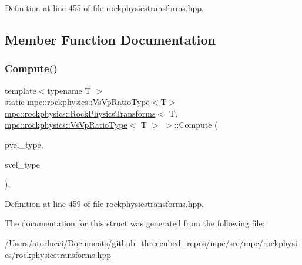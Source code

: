 Definition at line 455 of file rockphysicstransforms.\+hpp.



\subsection{Member Function Documentation}
\mbox{\label{structmpc_1_1rockphysics_1_1_rock_physics_transforms_3_01_t_00_01mpc_1_1rockphysics_1_1_vs_vp_ratio_type_3_01_t_01_4_01_4_a01ef06c639283c426ee380cf34c05813}} 
\subsubsection{\texorpdfstring{Compute()}{Compute()}}
{\footnotesize\ttfamily template$<$typename T $>$ \\
static \mbox{\hyperlink{structmpc_1_1rockphysics_1_1_vs_vp_ratio_type}{mpc\+::rockphysics\+::\+Vs\+Vp\+Ratio\+Type}}$<$T$>$ \mbox{\hyperlink{structmpc_1_1rockphysics_1_1_rock_physics_transforms}{mpc\+::rockphysics\+::\+Rock\+Physics\+Transforms}}$<$ T, \mbox{\hyperlink{structmpc_1_1rockphysics_1_1_vs_vp_ratio_type}{mpc\+::rockphysics\+::\+Vs\+Vp\+Ratio\+Type}}$<$ T $>$ $>$\+::Compute (\begin{DoxyParamCaption}\item[{const \mbox{\hyperlink{structmpc_1_1rockphysics_1_1_compressional_wave_velocity_type}{mpc\+::rockphysics\+::\+Compressional\+Wave\+Velocity\+Type}}$<$ T $>$ \&}]{pvel\+\_\+type,  }\item[{const \mbox{\hyperlink{structmpc_1_1rockphysics_1_1_shear_wave_velocity_type}{mpc\+::rockphysics\+::\+Shear\+Wave\+Velocity\+Type}}$<$ T $>$ \&}]{svel\+\_\+type }\end{DoxyParamCaption})\hspace{0.3cm}{\ttfamily [inline]}, {\ttfamily [static]}}



Definition at line 459 of file rockphysicstransforms.\+hpp.



The documentation for this struct was generated from the following file\+:\begin{DoxyCompactItemize}
\item 
/\+Users/atorlucci/\+Documents/github\+\_\+threecubed\+\_\+repos/mpc/src/mpc/rockphysics/\mbox{\hyperlink{rockphysicstransforms_8hpp}{rockphysicstransforms.\+hpp}}\end{DoxyCompactItemize}
